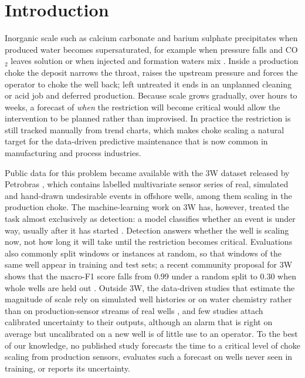\section{Introduction}\label{sec:intro}

Inorganic scale such as calcium carbonate and barium sulphate precipitates when produced water becomes
supersaturated, for example when pressure falls and CO$_2$ leaves solution or when injected and formation
waters mix \citep{kamal2018,olajire2015}. Inside a production choke the deposit narrows the throat, raises
the upstream pressure and forces the operator to choke the well back; left untreated it ends in an
unplanned cleaning or acid job and deferred production. Because scale grows gradually, over hours to
weeks, a forecast of \emph{when} the restriction will become critical would allow the intervention to be
planned rather than improvised. In practice the restriction is still tracked manually from trend charts,
which makes choke scaling a natural target for the data-driven predictive maintenance that is now common in
manufacturing and process industries.

Public data for this problem became available with the 3W dataset released by Petrobras
\citep{vargas2019,vargas2026}, which contains labelled multivariate sensor series of real, simulated and
hand-drawn undesirable events in offshore wells, among them scaling in the production choke. The
machine-learning work on 3W has, however, treated the task almost exclusively as detection: a model
classifies whether an event is under way, usually after it has started \citep{aranha2024,lopes2025,lopes2026}.
Detection answers whether the well is scaling now, not how long it will take until the restriction becomes
critical. Evaluations also commonly split windows or instances at random, so that windows of the same well
appear in training and test sets; a recent community proposal for 3W shows that the macro-F1 score falls
from 0.99 under a random split to 0.30 when whole wells are held out \citep{issue231}. Outside 3W, the
data-driven studies that estimate the magnitude of scale rely on simulated well histories or on water
chemistry rather than on production-sensor streams of real wells
\citep{cheng2022,askar2025,su2024,molina2025}, and few studies attach calibrated uncertainty to their
outputs, although an alarm that is right on average but uncalibrated on a new well is of little use to an
operator. To the best of our knowledge, no published study forecasts the time to a critical level of choke
scaling from production sensors, evaluates such a forecast on wells never seen in training, or reports its
uncertainty.

